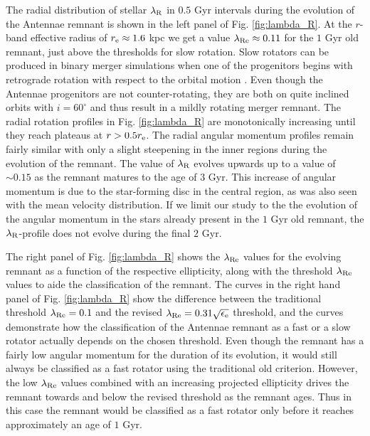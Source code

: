 \documentclass[a4paper,fleqn,usenatbib]{mnras}
\begin{document}
The radial distribution of stellar $\lambda_{\rm{R}}$ in $0.5$ Gyr intervals during the evolution of the Antennae 
remnant is shown in the left panel of Fig. \ref{fig:lambda_R}.
At the $r$-band effective radius of $r_{\rm{e}}\approx1.6$ kpc we get a value 
$\lambda_{\rm{Re}}\approx0.11$ for the $1$ Gyr old remnant, just above the thresholds for slow rotation. 
Slow rotators can be produced in binary merger simulations when one of the progenitors begins with retrograde
rotation with respect to the orbital motion \citep{2011MNRAS.416.1654B}. Even though the Antennae progenitors are not counter-rotating, 
they are both on quite inclined orbits with $i=60^{\circ}$ and thus result in a mildly rotating merger remnant. 
The radial rotation profiles in Fig. \ref{fig:lambda_R} are
monotonically increasing until they reach plateaus at $r>0.5r_{\rm{e}}$.
The radial angular momentum profiles remain fairly similar with only a slight steepening in 
the inner regions during the evolution of the remnant.
The value of $\lambda_{\rm{R}}$ evolves 
upwards up to a value of $\sim0.15$ as the remnant matures to the age of $3$ Gyr. This
increase of angular momentum is due to the star-forming
disc in the central region, as was also seen with the mean velocity distribution.
If we limit our study to the the evolution of the angular momentum in the stars already present in the $1$ Gyr old remnant,
the $\lambda_{\rm{R}}$-profile does not evolve during the final $2$ Gyr.

The right panel of Fig. \ref{fig:lambda_R} shows the $\lambda_{\rm{Re}}$ values
for the evolving remnant as a function of the respective ellipticity, along with the 
threshold $\lambda_{\rm{Re}}$ values to aide the classification of the remnant. The curves in the right hand panel of
Fig. \ref{fig:lambda_R} show the difference between the traditional threshold $\lambda_{\rm{Re}}=0.1$ and the revised
$\lambda_{\rm{Re}}=0.31\sqrt{\epsilon_{\rm{e}}}$ threshold, and the curves demonstrate how the classification of the
Antennae remnant as a fast or a slow rotator actually depends on the chosen threshold.
Even though the remnant has a fairly low angular momentum for the duration of its evolution, it would still
always be classified as a fast rotator using the traditional old criterion.
However, the low $\lambda_{\rm{Re}}$ values combined with an increasing projected ellipticity drives
the remnant towards and below the revised \citet{2011MNRAS.414..888E} threshold as the remnant ages. Thus in this case 
the remnant would be classified as a fast rotator only before it reaches approximately an age of $1$ Gyr.
\end{document}
